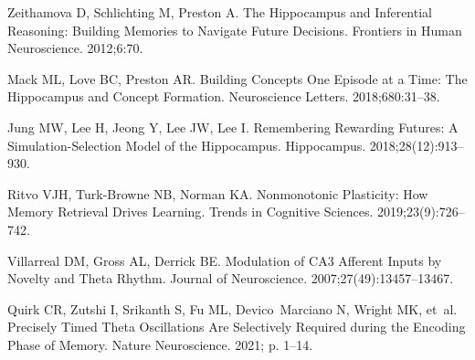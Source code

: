 \documentclass[10pt,letterpaper]{article}
\begin{document}
\begin{thebibliography}{10}
  Zeithamova D, Schlichting M, Preston A.
  \newblock The Hippocampus and Inferential Reasoning: Building Memories to
    Navigate Future Decisions.
  \newblock Frontiers in Human Neuroscience. 2012;6:70.
  
  Mack ML, Love BC, Preston AR.
  \newblock Building Concepts One Episode at a Time: {{The}} Hippocampus and
    Concept Formation.
  \newblock Neuroscience Letters. 2018;680:31--38.
  
  Jung MW, Lee H, Jeong Y, Lee JW, Lee I.
  \newblock Remembering Rewarding Futures: {{A}} Simulation-Selection Model of
    the Hippocampus.
  \newblock Hippocampus. 2018;28(12):913--930.
  
  Ritvo VJH, {Turk-Browne} NB, Norman KA.
  \newblock Nonmonotonic {{Plasticity}}: {{How Memory Retrieval Drives
    Learning}}.
  \newblock Trends in Cognitive Sciences. 2019;23(9):726--742.
  
  Villarreal DM, Gross AL, Derrick BE.
  \newblock Modulation of {{CA3 Afferent Inputs}} by {{Novelty}} and {{Theta
    Rhythm}}.
  \newblock Journal of Neuroscience. 2007;27(49):13457--13467.
  
  Quirk CR, Zutshi I, Srikanth S, Fu ML, Devico~Marciano N, Wright MK, et~al.
  \newblock Precisely Timed Theta Oscillations Are Selectively Required during
    the Encoding Phase of Memory.
  \newblock Nature Neuroscience. 2021; p. 1--14.
  
  \end{thebibliography}
  
\end{document}
